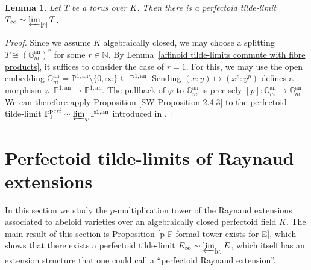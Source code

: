 \documentclass[10pt,oneside]{amsart}
\newtheorem{lemma}[theorem]{Lemma}
\theoremstyle{definition}
\newtheorem{remark}[theorem]{Remark}
\newcommand{\an}{\mathrm{an}}
\newcommand{\N}{\mathbb{N}}
\begin{document}
\begin{lemma}\label{l:tilde-limit-of-torus}
	Let $T$ be a torus over $K$. Then there is a perfectoid tilde-limit $T_\infty\sim \varprojlim_{[p]} T$.
\end{lemma}
\begin{proof}
Since we assume $K$ algebraically closed, we may choose a splitting $T\cong (\mathbb{G}_m^{\an})^r$ for some $r\in \N$. By Lemma~\ref{affinoid tilde-limits commute with fibre products}, it suffices to consider the case of $r=1$. For this, we may use the open embedding $\mathbb G_m^{\an}= \mathbb P^{1,\an}\setminus\{0, \infty\}\subseteq \mathbb P^{1,\an}$. Sending $(x:y)\mapsto (x^p:y^p)$ defines a morphism $\varphi:\mathbb P^{1,\an}\to \mathbb P^{1,\an}$. The pullback of $\varphi$ to $\mathbb G_m^{\an}$ is precisely $[p]:\mathbb G_m^{\an}\to \mathbb G_m^{\an}$. We can therefore apply Proposition \ref{SW Proposition 2.4.3} to the perfectoid tilde-limit $\mathbb P_1^{\text{perf}}\sim \varprojlim_{\varphi} \mathbb P^{1,\an}$ introduced in \cite{perfectoid}. 
\end{proof}

			

	
 
	
 
	

	\section{Perfectoid tilde-limits of Raynaud extensions}\label{Raynaud extensions as principal bundles of formal and rigid spaces}
	In this section we study the $p$-multiplication tower of the Raynaud extensions associated to abeloid varieties over an algebraically closed perfectoid field $K$. The main result of this section is Proposition \ref{p-F-formal tower exists for E}, which shows that there exists a perfectoid tilde-limit $E_\infty \sim \varprojlim_{[p]} E$, which itself has an extension structure that one could call a ``perfectoid Raynaud extension''.  
	
\end{document}
